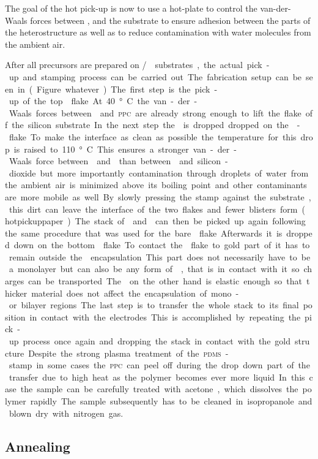 The goal of the hot pick-up is now to use a hot-plate to control the van-der-Waals forces between \hbn, \tmds and the substrate to ensure adhesion between the parts of the heterostructure as well as to reduce contamination with water molecules from the ambient air.

After all precursors are prepared on \si/\sio substrates, the actual pick-up and stamping process can be carried out. The fabrication setup can be seen in (Figure whatever). The first step is the pick-up of the top \hbng flake. At 40°C the van-der-Waals forces between \hbng and \textsc{ppc} are already strong enough to lift the flake off the silicon substrate. In the next step the \hbng is dropped dropped on the \tmd-flake. To make the interface as clean as possible the temperature for this drop is raised to 110°C. This ensures a stronger van-der-Waals force between \hbng and \tmdg than between \tmdg and silicon-dioxide but more importantly contamination through droplets of water from the ambient air is minimized above its boiling point and other contaminants are more mobile as well. By slowly pressing the stamp against the substrate, this dirt can leave the interface of the two flakes and fewer blisters form(hotpickuppaper). The stack of \tmdg and \hbng can then be picked up again following the same procedure that was used for the bare \hbng flake. Afterwards it is dropped down on the bottom \hbng flake. To contact the \tmdg flake to gold part of it has to remain outside the \hbng encapsulation. This part does not necessarily have to be a monolayer but can also be any form of \tmdg, that is in contact with it so charges can be transported. The \hbng on the other hand is elastic enough so that thicker material does not affect the encapsulation of mono- or bilayer regions.

The last step is to transfer the whole stack to its final position in contact with the electrodes. This is accomplished by repeating the pick-up process once again and dropping the stack in contact with the gold structure.

Despite the strong plasma treatment of the \textsc{pdms}-stamp in some cases the \textsc{ppc} can peel off during the drop down part of the transfer due to high heat as the polymer becomes ever more liquid. In this case the sample can be carefully treated with acetone, which dissolves the polymer rapidly. The sample subsequently has to be cleaned in isopropanole and blown dry with nitrogen gas. 

\subsection{Annealing}

